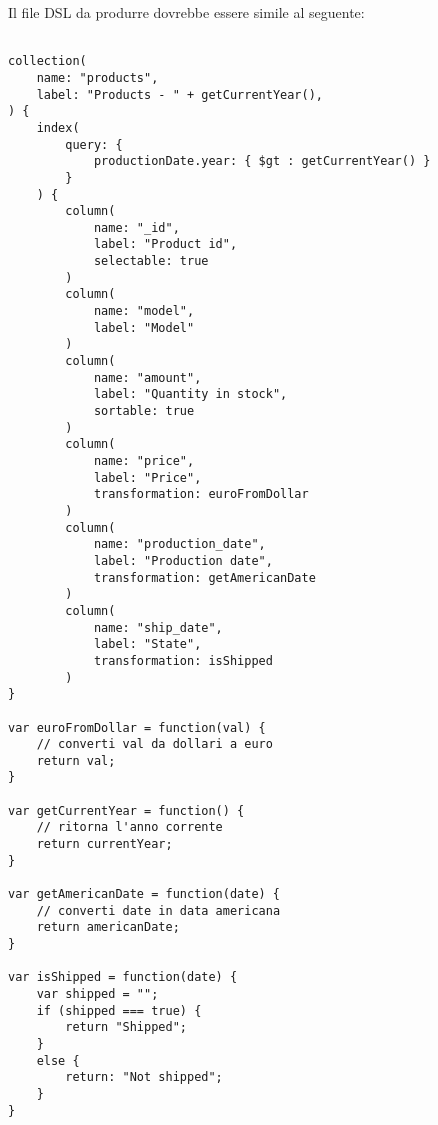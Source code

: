 Il file DSL da produrre dovrebbe essere simile al seguente:

\begin{lstlisting}

collection(
	name: "products",
	label: "Products - " + getCurrentYear(),
) {
	index(
		query: { 
			productionDate.year: { $gt : getCurrentYear() } 
		}
	) {
		column(
			name: "_id",
			label: "Product id",
			selectable: true
		)
		column(
			name: "model",
			label: "Model"
		)
		column(
			name: "amount",
			label: "Quantity in stock",
			sortable: true
		)
		column(
			name: "price",
			label: "Price",
			transformation: euroFromDollar
		)
		column(
			name: "production_date",
			label: "Production date",
			transformation: getAmericanDate
		)
		column(
			name: "ship_date",
			label: "State",
			transformation: isShipped
		)
}

var euroFromDollar = function(val) {
	// converti val da dollari a euro
	return val;
}

var getCurrentYear = function() {
	// ritorna l'anno corrente
	return currentYear;
}

var getAmericanDate = function(date) {
	// converti date in data americana
	return americanDate;
}

var isShipped = function(date) {
	var shipped = "";
	if (shipped === true) {
		return "Shipped";
	}
	else {
		return: "Not shipped";
	}
}

\end{lstlisting}